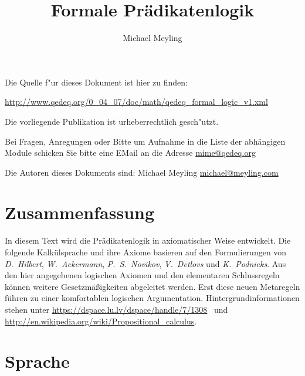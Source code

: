 \documentclass[a4paper,german,10pt,twoside]{book}
\title{Formale Pr{\"a}dikatenlogik}
\author{
Michael Meyling
}
\theoremstyle{definition}
\theoremstyle{remark}
\begin{document}
\maketitle

\setlength{\parskip}{5pt plus 2pt minus 1pt}
\mbox{}
\vfill

\par
Die Quelle f{"ur} dieses Dokument ist hier zu finden:
\par
\url{http://www.qedeq.org/0_04_07/doc/math/qedeq_formal_logic_v1.xml}

\par
Die vorliegende Publikation ist urheberrechtlich gesch{"u}tzt.
\par
Bei Fragen, Anregungen oder Bitte um Aufnahme in die Liste der abh{\"a}ngigen Module schicken Sie bitte eine EMail an die Adresse \href{mailto:mime@qedeq.org}{mime@qedeq.org}

\par
Die Autoren dieses Dokuments sind:
Michael Meyling \href{mailto:michael@meyling.com}{michael@meyling.com}



\setlength{\parskip}{0pt}
\tableofcontents

\setlength{\parskip}{5pt plus 2pt minus 1pt}

\chapter*{Zusammenfassung} \label{chapter1} \hypertarget{chapter1}{}

In diesem Text wird die Pr{\"a}dikatenlogik in axiomatischer Weise entwickelt.
Die folgende Kalk{\"u}lsprache und ihre Axiome basieren auf den Formulierungen von \emph{D.~Hilbert}, \emph{W.~Ackermann}\cite{hilback}, \emph{P.~S.~Novikov}\cite{novikov}, \emph{V.~Detlovs} und \emph{K.~Podnieks}\cite{detnieks}. Aus den hier angegebenen logischen Axiomen und den elementaren Schlussregeln k{\"o}nnen weitere Gesetzm{\"a}{\ss}igkeiten abgeleitet werden. Erst diese neuen Metaregeln f{\"u}hren zu einer komfortablen logischen Argumentation.
Hintergrundinformationen stehen unter \url{ https://dspace.lu.lv/dspace/handle/7/1308}~\cite{detnieks}
und \url{http://en.wikipedia.org/wiki/Propositional_calculus}.


\chapter{Sprache} \label{chapter2} \hypertarget{chapter2}{}
\end{document}
